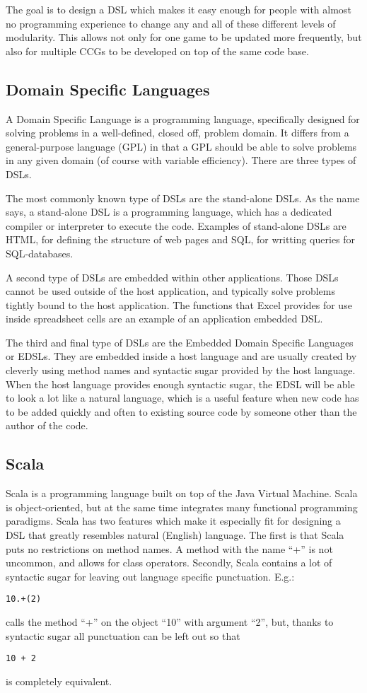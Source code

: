 \documentclass[twocolumn]{phdsymp}
\begin{document}
The goal is to design a DSL which makes it easy enough for people with almost no programming experience to change any and all of these different levels of modularity. This allows not only for one game to be updated more frequently, but also for multiple CCGs to be developed on top of the same code base.
\subsection{Domain Specific Languages}
\label{DSLs}
A Domain Specific Language is a programming language, specifically designed for solving problems in a well-defined, closed off, problem domain. It differs from a general-purpose language (GPL) in that a GPL should be able to solve problems in any given domain (of course with variable efficiency). There are three types of DSLs.

The most commonly known type of DSLs are the stand-alone DSLs. As the name says, a stand-alone DSL is a programming language, which has a dedicated compiler or interpreter to execute the code. Examples of stand-alone DSLs are HTML, for defining the structure of web pages and SQL, for writting queries for SQL-databases.

A second type of DSLs are embedded within other applications. Those DSLs cannot be used outside of the host application, and typically solve problems tightly bound to the host application. The functions that Excel provides for use inside spreadsheet cells are an example of an application embedded DSL.

The third and final type of DSLs are the Embedded Domain Specific Languages or EDSLs. They are embedded inside a host language and are usually created by cleverly using method names and syntactic sugar provided by the host language. When the host language provides enough syntactic sugar, the EDSL will be able to look a lot like a natural language, which is a useful feature when new code has to be added quickly and often to existing source code by someone other than the author of the code.
\subsection{Scala}
\label{Scala}
Scala is a programming language built on top of the Java Virtual Machine. Scala is object-oriented, but at the same time integrates many functional programming paradigms. Scala has two features which make it especially fit for designing a DSL that greatly resembles natural (English) language. The first is that Scala puts no restrictions on method names. A method with the name ``+'' is not uncommon, and allows for class operators. Secondly, Scala contains a lot of syntactic sugar for leaving out language specific punctuation. E.g.:
\begin{verbatim}
10.+(2)
\end{verbatim}
calls the method ``+'' on the object ``10'' with argument ``2'', but, thanks to syntactic sugar all punctuation can be left out so that
\begin{verbatim}
10 + 2
\end{verbatim}
is completely equivalent.
\end{document}
